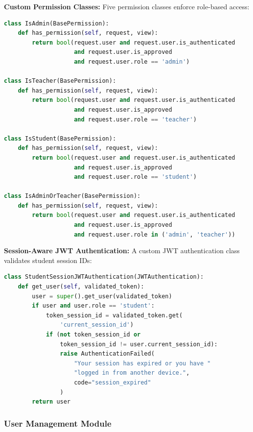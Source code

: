 \textbf{Custom Permission Classes:} Five permission classes enforce role-based access:

\begin{lstlisting}[language=Python, caption={Permission Classes (core/permissions.py)}]
class IsAdmin(BasePermission):
    def has_permission(self, request, view):
        return bool(request.user and request.user.is_authenticated 
                    and request.user.is_approved 
                    and request.user.role == 'admin')

class IsTeacher(BasePermission):
    def has_permission(self, request, view):
        return bool(request.user and request.user.is_authenticated 
                    and request.user.is_approved 
                    and request.user.role == 'teacher')

class IsStudent(BasePermission):
    def has_permission(self, request, view):
        return bool(request.user and request.user.is_authenticated 
                    and request.user.is_approved 
                    and request.user.role == 'student')

class IsAdminOrTeacher(BasePermission):
    def has_permission(self, request, view):
        return bool(request.user and request.user.is_authenticated 
                    and request.user.is_approved
                    and request.user.role in ('admin', 'teacher'))
\end{lstlisting}

\textbf{Session-Aware JWT Authentication:} A custom JWT authentication class validates student session IDs:

\begin{lstlisting}[language=Python, caption={Session-Aware JWT (core/authentication.py)}]
class StudentSessionJWTAuthentication(JWTAuthentication):
    def get_user(self, validated_token):
        user = super().get_user(validated_token)
        if user and user.role == 'student':
            token_session_id = validated_token.get(
                'current_session_id')
            if (not token_session_id or 
                token_session_id != user.current_session_id):
                raise AuthenticationFailed(
                    "Your session has expired or you have "
                    "logged in from another device.",
                    code="session_expired"
                )
        return user
\end{lstlisting}

\subsubsection{User Management Module}

